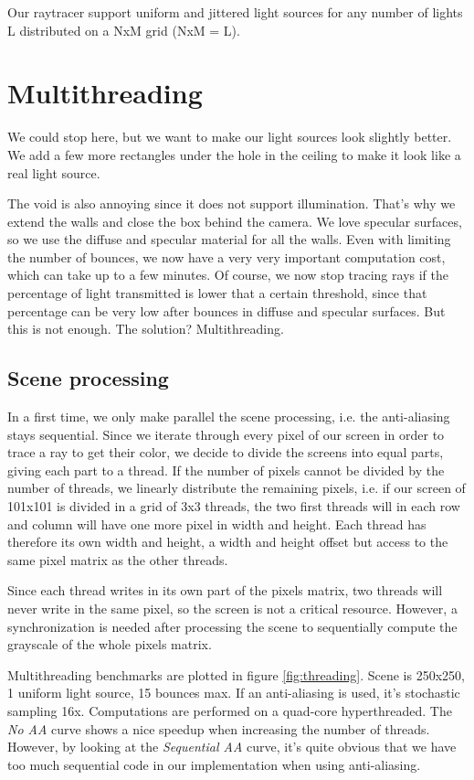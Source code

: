 Our raytracer support uniform and jittered light sources for any number of lights L distributed on a NxM grid (NxM = L).


\section{Multithreading}
We could stop here, but we want to make our light sources look slightly better. We add a few more rectangles under the hole in the ceiling to make it look like a real light source.

The void is also annoying since it does not support illumination. That's why we extend the walls and close the box behind the camera. We love specular surfaces, so we use the diffuse and specular material for all the walls. Even with limiting the number of bounces, we now have a very very important computation cost, which can take up to a few minutes. Of course, we now stop tracing rays if the percentage of light transmitted is lower that a certain threshold, since that percentage can be very low after bounces in diffuse and specular surfaces. But this is not enough. The solution? Multithreading.

\subsection{Scene processing}
In a first time, we only make parallel the scene processing, i.e. the anti-aliasing stays sequential. Since we iterate through every pixel of our screen in order to trace a ray to get their color, we decide to divide the screens into equal parts, giving each part to a thread. If the number of pixels cannot be divided by the number of threads, we linearly distribute the remaining pixels, i.e. if our screen of 101x101 is divided in a grid of 3x3 threads, the two first threads will in each row and column will have one more pixel in width and height. Each thread has therefore its own width and height, a width and height offset but access to the same pixel matrix as the other threads.

Since each thread writes in its own part of the pixels matrix, two threads will never write in the same pixel, so the screen is not a critical resource. However, a synchronization is needed after processing the scene to sequentially compute the grayscale of the whole pixels matrix.

Multithreading benchmarks are plotted in figure \ref{fig:threading}. Scene is 250x250, 1 uniform light source, 15 bounces max. If an anti-aliasing is used, it's stochastic sampling 16x. Computations are performed on a quad-core hyperthreaded. The \textit{No AA} curve shows a nice speedup when increasing the number of threads. However, by looking at the \textit{Sequential AA} curve, it's quite obvious that we have too much sequential code in our implementation when using anti-aliasing.

